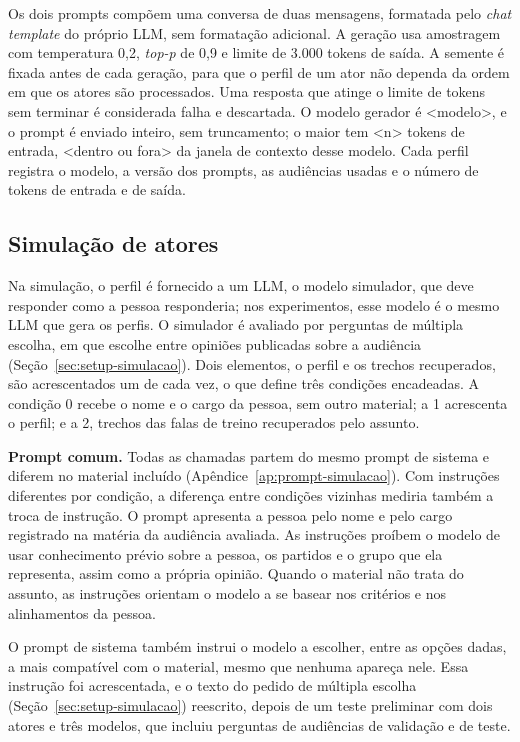 Os dois prompts compõem uma conversa de duas mensagens, formatada pelo \textit{chat template} do
próprio LLM, sem formatação adicional. A geração usa amostragem com temperatura 0,2, \textit{top-p}
de 0,9 e limite de 3.000 tokens de saída. A semente é fixada antes de cada geração, para que o perfil
de um ator não dependa da ordem em que os atores são processados. Uma resposta que atinge o limite de
tokens sem terminar é considerada falha e descartada. O modelo gerador é <modelo>, e o prompt é
enviado inteiro, sem truncamento; o maior tem <n> tokens de entrada, <dentro ou fora> da janela de
contexto desse modelo. Cada perfil registra o modelo, a versão dos prompts, as audiências usadas e o
número de tokens de entrada e de saída.


\subsection{Simulação de atores}
\label{sec:metodo-simulacao}

Na simulação, o perfil é fornecido a um LLM, o modelo simulador, que deve responder como a pessoa
responderia; nos experimentos, esse modelo é o mesmo LLM que gera os perfis. O simulador é avaliado
por perguntas de múltipla escolha, em que escolhe entre opiniões publicadas sobre a audiência
(Seção~\ref{sec:setup-simulacao}). Dois elementos, o perfil e os trechos recuperados, são
acrescentados um de cada vez, o que define três condições encadeadas. A condição 0 recebe o nome e o
cargo da pessoa, sem outro material; a 1 acrescenta o perfil; e a 2, trechos das falas de treino
recuperados pelo assunto.

\textbf{Prompt comum.} Todas as chamadas partem do mesmo prompt de sistema e diferem no material
incluído (Apêndice~\ref{ap:prompt-simulacao}). Com instruções diferentes por condição, a diferença
entre condições vizinhas mediria também a troca de instrução. O prompt apresenta a pessoa pelo nome
e pelo cargo registrado na matéria da audiência avaliada. As instruções proíbem o modelo de usar
conhecimento prévio sobre a pessoa, os partidos e o grupo que ela representa, assim como a própria
opinião. Quando o material não trata do assunto, as instruções orientam o modelo a se basear nos
critérios e nos alinhamentos da pessoa.

O prompt de sistema também instrui o modelo a escolher, entre as opções dadas, a mais compatível com
o material, mesmo que nenhuma apareça nele. Essa instrução foi acrescentada, e o texto do pedido de
múltipla escolha (Seção~\ref{sec:setup-simulacao}) reescrito, depois de um teste preliminar com dois
atores e três modelos, que incluiu perguntas de audiências de validação e de teste.

